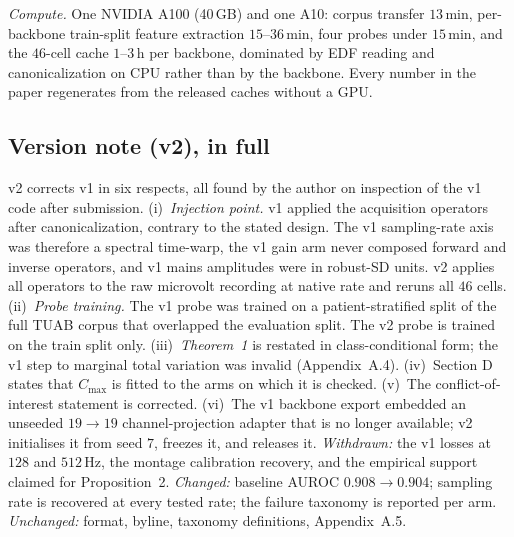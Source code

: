 \documentclass[conference]{IEEEtran}
\begin{document}
\textit{Compute.} One NVIDIA A100 (40\,GB) and one A10: corpus
transfer $13$\,min, per-backbone train-split feature extraction
$15$--$36$\,min, four probes under $15$\,min, and the $46$-cell cache
$1$--$3$\,h per backbone, dominated by EDF reading and canonicalization
on CPU rather than by the backbone. Every number in the paper
regenerates from the released caches without a GPU.


\subsection{Version note (v2), in full}


v2 corrects v1 in six respects, all found by the author on inspection
of the v1 code after submission.
(i)~\emph{Injection point.} v1 applied the acquisition operators after
canonicalization, contrary to the stated design. The v1 sampling-rate
axis was therefore a spectral time-warp, the v1 gain arm never composed
forward and inverse operators, and v1 mains amplitudes were in robust-SD
units. v2 applies all operators to the raw microvolt recording at native
rate and reruns all $46$ cells.
(ii)~\emph{Probe training.} The v1 probe was trained on a
patient-stratified split of the full TUAB corpus that overlapped the
evaluation split. The v2 probe is trained on the train split only.
(iii)~\emph{Theorem~1} is restated in class-conditional form;
the v1 step to marginal total variation was invalid (Appendix~A.4).
(iv)~Section D states that $C_{\max}$ is fitted to the
arms on which it is checked.
(v)~The conflict-of-interest statement is corrected.
(vi)~The v1 backbone export embedded an unseeded $19{\to}19$
channel-projection adapter that is no longer available; v2 initialises
it from seed $7$, freezes it, and releases it.
\emph{Withdrawn:} the v1 losses at $128$ and $512$\,Hz, the montage
calibration recovery, and the empirical support claimed for
Proposition~2. \emph{Changed:} baseline AUROC $0.908 \to
0.904$; sampling rate is recovered at every tested rate; the failure
taxonomy is reported per arm. \emph{Unchanged:} format, byline,
taxonomy definitions, Appendix~A.5.

\end{document}
